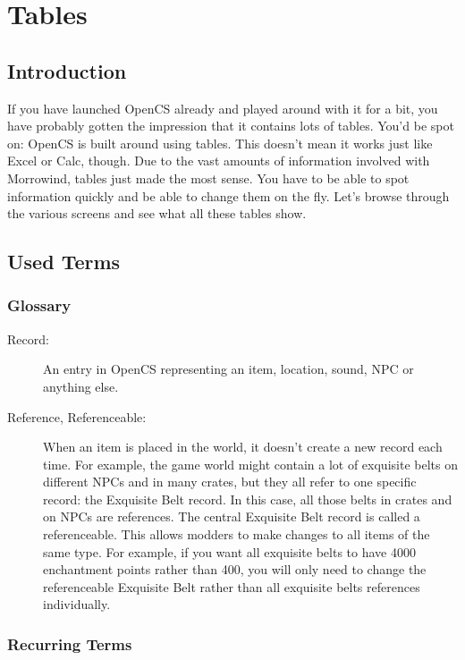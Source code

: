 \section{Tables}

\subsection{Introduction}
If you have launched OpenCS already and played around with it for a bit, you have probably gotten the impression that it contains lots of tables. You'd be spot on: OpenCS is built around using tables. This doesn't mean it works just like Excel or Calc, though. Due to the vast amounts of information involved with Morrowind, tables just made the most sense. You have to be able to spot information quickly and be able to change them on the fly. Let's browse through the various screens and see what all these tables show.

\subsection{Used Terms}

\subsubsection{Glossary}

\begin{description}
 \item[Record:] An entry in OpenCS representing an item, location, sound, NPC or anything else.

 \item[Reference, Referenceable:] When an item is placed in the world, it doesn't create a new record each time. For example, the game world might contain a lot of exquisite belts on different NPCs and in many crates, but they all refer to one specific record: the Exquisite Belt record. In this case, all those belts in crates and on NPCs are references. The central Exquisite Belt record is called a referenceable. This allows modders to make changes to all items of the same type. For example, if you want all exquisite belts to have 4000 enchantment points rather than 400, you will only need to change the referenceable Exquisite Belt rather than all exquisite belts references individually.
\end{description}

\subsubsection{Recurring Terms}


